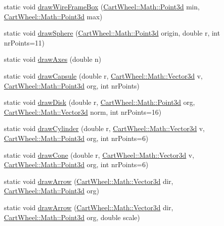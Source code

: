 \begin{DoxyCompactItemize}
\item 
static void \hyperlink{classCartWheel_1_1GL_1_1GLUtils_aaa7dcd583875247aad79c8f77e076387}{drawWireFrameBox} (\hyperlink{classCartWheel_1_1Math_1_1Point3d}{CartWheel::Math::Point3d} min, \hyperlink{classCartWheel_1_1Math_1_1Point3d}{CartWheel::Math::Point3d} max)
\item 
static void \hyperlink{classCartWheel_1_1GL_1_1GLUtils_a57e1b070853a240d42fd158c0865ec34}{drawSphere} (\hyperlink{classCartWheel_1_1Math_1_1Point3d}{CartWheel::Math::Point3d} origin, double r, int nrPoints=11)
\item 
static void \hyperlink{classCartWheel_1_1GL_1_1GLUtils_af963104ed3a61b0bff025f4e0f45f41b}{drawAxes} (double n)
\item 
static void \hyperlink{classCartWheel_1_1GL_1_1GLUtils_a2b5bffa837b2d397e14bfb6dcc5f8cd6}{drawCapsule} (double r, \hyperlink{classCartWheel_1_1Math_1_1Vector3d}{CartWheel::Math::Vector3d} v, \hyperlink{classCartWheel_1_1Math_1_1Point3d}{CartWheel::Math::Point3d} org, int nrPoints)
\item 
static void \hyperlink{classCartWheel_1_1GL_1_1GLUtils_a7df28e360c5d891833d4c519fee1c357}{drawDisk} (double r, \hyperlink{classCartWheel_1_1Math_1_1Point3d}{CartWheel::Math::Point3d} org, \hyperlink{classCartWheel_1_1Math_1_1Vector3d}{CartWheel::Math::Vector3d} norm, int nrPoints=16)
\item 
static void \hyperlink{classCartWheel_1_1GL_1_1GLUtils_a06961de0b130d7e3171f7d6910ff35f1}{drawCylinder} (double r, \hyperlink{classCartWheel_1_1Math_1_1Vector3d}{CartWheel::Math::Vector3d} v, \hyperlink{classCartWheel_1_1Math_1_1Point3d}{CartWheel::Math::Point3d} org, int nrPoints=6)
\item 
static void \hyperlink{classCartWheel_1_1GL_1_1GLUtils_a981b7a750f3e431914d8fd3ff13713d1}{drawCone} (double r, \hyperlink{classCartWheel_1_1Math_1_1Vector3d}{CartWheel::Math::Vector3d} v, \hyperlink{classCartWheel_1_1Math_1_1Point3d}{CartWheel::Math::Point3d} org, int nrPoints=6)
\item 
static void \hyperlink{classCartWheel_1_1GL_1_1GLUtils_a68b05f7e87ec35561d823ac468a39955}{drawArrow} (\hyperlink{classCartWheel_1_1Math_1_1Vector3d}{CartWheel::Math::Vector3d} dir, \hyperlink{classCartWheel_1_1Math_1_1Point3d}{CartWheel::Math::Point3d} org)
\item 
static void \hyperlink{classCartWheel_1_1GL_1_1GLUtils_aef19ec5684b19b50fad9944b2ba4d490}{drawArrow} (\hyperlink{classCartWheel_1_1Math_1_1Vector3d}{CartWheel::Math::Vector3d} dir, \hyperlink{classCartWheel_1_1Math_1_1Point3d}{CartWheel::Math::Point3d} org, double scale)

\end{DoxyCompactItemize}
